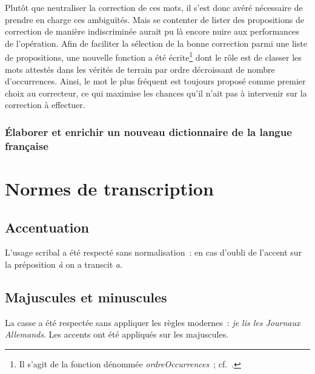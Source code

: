 \documentclass[a4paper,12pt,twoside]{book}
\begin{document}
				Plutôt que neutraliser la correction de ces mots, il s'est donc avéré nécessaire de prendre en charge ces ambiguïtés. Mais se contenter de lister des propositions de correction de manière indiscriminée aurait pu là encore nuire aux performances de l'opération. Afin de faciliter la sélection de la bonne correction parmi une liste de propositions, une nouvelle fonction a été écrite\footnote{Il s'agit de la fonction dénommée \textit{ordreOccurrences}~; cf.~\cite{biaySpellcheckTextsPy2022}.} dont le rôle est de classer les mots attestés dans les vérités de terrain par ordre décroissant de nombre d'occurrences. Ainsi, le mot le plus fréquent est toujours proposé comme premier choix au correcteur, ce qui maximise les chances qu'il n'ait pas à intervenir sur la correction à effectuer.
			
			\subsection{Élaborer et enrichir un nouveau dictionnaire de la langue française}
				
			
	\appendix
	
	\renewcommand{\appendixpagename}{Annexes}
	
	\renewcommand{\appendixtocname}{Annexes}
	
	\addappheadtotoc%
	
	\appendixpage %
	\chapter{Normes de transcription}
		\label{normes-trans}
	
		\section{Accentuation}
			L'usage scribal a été respecté sans normalisation~: en cas d'oubli de l'accent sur la préposition \textit{à} on a transcit \textit{a}.
		
		\section{Majuscules et minuscules}
			La casse a été respectée sans appliquer les règles modernes~: \textit{je lis les Journaux Allemands}. Les accents ont été appliqués sur les majuscules.
		
\end{document}
